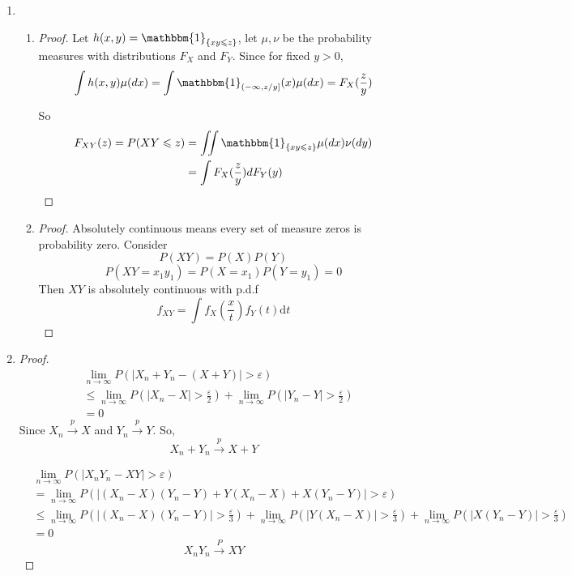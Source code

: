 \documentclass{article}
\begin{document}
\begin{enumerate}
        \item \begin{enumerate}
            \item \begin{proof} 
                Let $h(x,y)=\mathbbm{1}_{\{xy\leqslant z\}}$, let $\mu,\nu$ be the probability measures with distributions $F_X$ and $F_Y$. Since for fixed $y>0$,
                $$\int{h(x,y)\mu(dx)}=\int{\mathbbm{1}_{(-\infty,z/y]}(x)\mu(dx)}=F_X(\frac{z}{y})$$
                
                So
                \begin{align*}
                    F_{XY}(z)=P(XY\leqslant z)&=\iint{\mathbbm{1}_{\{xy\leqslant z\}}\mu(dx)\nu(dy)}\\
                    &=\int F_X(\frac{z}{y})dF_Y(y)
                \end{align*}
            \end{proof}
            \item \begin{proof}
                Absolutely continuous means every set of measure zeros is probability zero. Consider
                $$P(XY)=P(X)P(Y)$$
                $$P(XY=x_1y_1)=P(X=x_1)P(Y=y_1)=0$$
                Then $XY$ is absolutely continuous with p.d.f
                $$f_{XY}=\int f_{X}\left(\frac{x}{t}\right)f_{Y}(t) \text{d}t$$
            \end{proof}
            \end{enumerate}


        \item \begin{proof}
            \begin{align*}
                &\lim_{n\to\infty}P\left(|X_n+Y_n-(X+Y)|> \varepsilon\right)\\
                &\leqslant \lim_{n\to\infty}P\left(|X_n-X|>\frac{\varepsilon}{2}\right)+\lim_{n\to\infty}P\left(|Y_n-Y|>\frac{\varepsilon}{2}\right)\\
                &=0
            \end{align*}
            Since $X_n \overset{p}{\to} X$ and $Y_n \overset{p}{\to} Y$.
            So, $$X_n+Y_n \overset{p}{\to} X+Y$$

            \begin{align*}
                &\lim_{n\to\infty} P\left(|X_nY_n-XY|>\varepsilon\right)\\
                &=\lim_{n\to\infty} P\left(|(X_n-X)(Y_n-Y)+Y(X_n-X)+X(Y_n-Y)|>\varepsilon\right)\\
                &\leqslant\lim_{n\to\infty}P\left(|(X_n-X)(Y_n-Y)|>\frac{\varepsilon}{3}\right)+\lim_{n\to\infty}P\left(|Y(X_n-X)|>\frac{\varepsilon}{3}\right)+\lim_{n\to\infty}P\left(|X(Y_n-Y)|>\frac{\varepsilon}{3}\right)\\
                &=0
            \end{align*}
            $$X_n Y_n\overset{P}{\to}XY$$
        \end{proof}


\end{enumerate}
\end{document}
